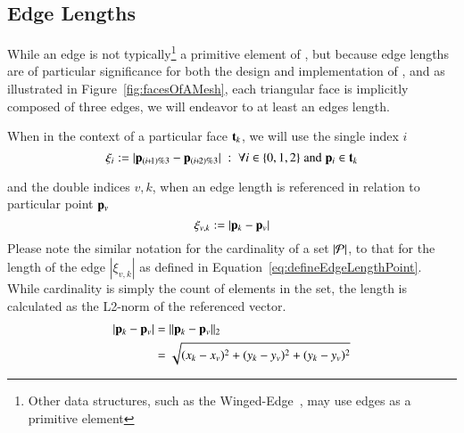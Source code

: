 \subsection{Edge Lengths}
\label{chBsEL}
While an edge is not typically\footnote{Other data structures, such as the Winged-Edge~\cite[p.~1]{Baumgart75}, may use edges as a primitive element} a primitive element of \tdd{}, but because edge lengths are of particular significance for both the design and implementation of , and as illustrated in Figure~\ref{fig:facesOfAMesh}, each triangular face is implicitly composed of three edges, we will endeavor to at least an edges length.

When in the context of a particular face $\mathbf{t}_k$, we will use the single index $i$
\begin{equation}
	\xi_i := |\bp_{(\sipo)\%3} - \bp_{(\sipt)\%3}| \;:\; \forall i \in\{0,1,2\} \;\text{and}\; \bp_i \in \bt_k
	\label{eq:defineEdgeLengthFace}
\end{equation}%
%

and the double indices $v,k$, when an edge length is referenced in relation to particular point $\mathbf{p}_v$
\begin{equation}
	\xi_{v,k} := |\mathbf{p}_k - \mathbf{p}_v|
	\label{eq:defineEdgeLengthPoint}
\end{equation}%
%
Please note the similar notation for the cardinality of a set $|\mathcal{P}|$, to that for the length of the edge $|\xi_{v,k}|$ as defined in Equation~\ref{eq:defineEdgeLengthPoint}. While cardinality is simply the count of elements in the set, the length is calculated as the L2-norm of the referenced vector.~\cite[p.~26]{Mara12}
\begin{equation}
\begin{aligned}
	|\mathbf{p}_k - \mathbf{p}_v| & = \lVert\mathbf{p}_k - \mathbf{p}_v\rVert_2 \\
					& = \sqrt{(x_k-x_v)^2 + (y_k-y_v)^2 + (y_k-y_v)^2}
	\label{eq:defineEdgeLengthCalc}
\end{aligned}
\end{equation}
%
